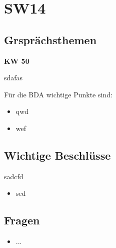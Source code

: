 \documentclass[10pt,a4paper]{article}
\begin{document}
\section*{SW14}


\subsection*{Grsprächsthemen}

\textbf{KW 50}


sdafas

\vspace{10 mm}
Für die BDA wichtige Punkte sind:
\begin{itemize}
	\item qwd
	\item wef
	
\end{itemize}

\subsection*{Wichtige Beschlüsse}
sadcfd
\begin{itemize}
	\item sed
\end{itemize}
\subsection*{Fragen}
\begin{itemize}
	\item ...
\end{itemize}
\end{document}
